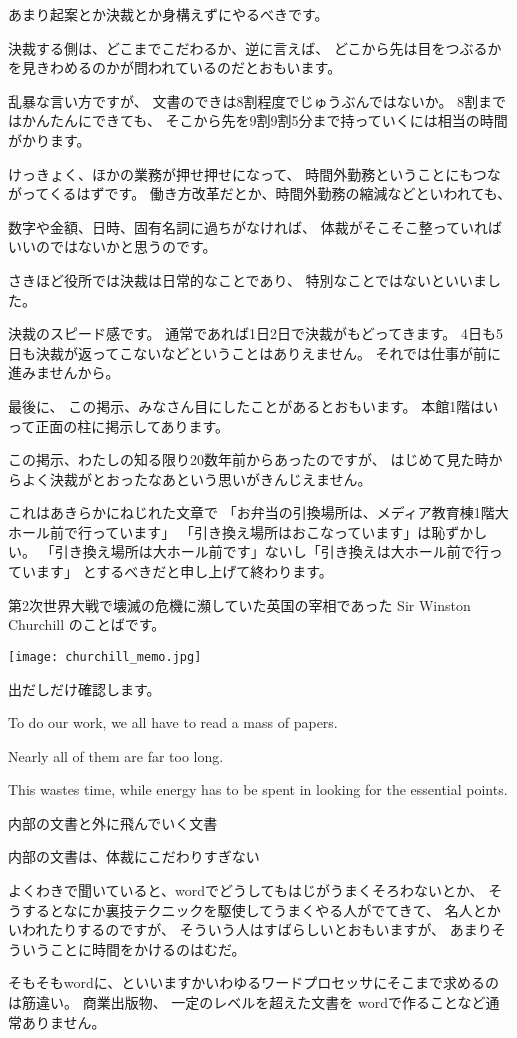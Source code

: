 \documentclass[uplatex,jis2004,dvipdfmx,12pt]{jsarticle}
\begin{document}
あまり起案とか決裁とか身構えずにやるべきです。

決裁する側は、どこまでこだわるか、逆に言えば、
どこから先は目をつぶるかを見きわめるのかが問われているのだとおもいます。


乱暴な言い方ですが、
文書のできは8割程度でじゅうぶんではないか。
8割まではかんたんにできても、
そこから先を9割9割5分まで持っていくには相当の時間がかります。

けっきょく、ほかの業務が押せ押せになって、
時間外勤務ということにもつながってくるはずです。
働き方改革だとか、時間外勤務の縮減などといわれても、


数字や金額、日時、固有名詞に過ちがなければ、
体裁がそこそこ整っていればいいのではないかと思うのです。






さきほど役所では決裁は日常的なことであり、
特別なことではないといいました。

決裁のスピード感です。
通常であれば1日2日で決裁がもどってきます。
4日も5日も決裁が返ってこないなどということはありえません。
それでは仕事が前に進みませんから。


最後に、
この掲示、みなさん目にしたことがあるとおもいます。
本館1階はいって正面の柱に掲示してあります。

この掲示、わたしの知る限り20数年前からあったのですが、
はじめて見た時からよく決裁がとおったなあという思いがきんじえません。

これはあきらかにねじれた文章で
「お弁当の引換場所は、メディア教育棟1階大ホール前で行っています」
「引き換え場所はおこなっています」は恥ずかしい。
「引き換え場所は大ホール前です」ないし「引き換えは大ホール前で行っています」
とするべきだと申し上げて終わります。



第2次世界大戦で壊滅の危機に瀕していた英国の宰相であった Sir Winston Churchill
のことばです。

\texttt{[image: churchill\_memo.jpg]}

出だしだけ確認します。

To do our work, we all have to read a mass of papers.

 Nearly all of them are far too long.

 This wastes time, while energy has to be spent in looking for the essential points.



内部の文書と外に飛んでいく文書

内部の文書は、体裁にこだわりすぎない

よくわきで聞いていると、wordでどうしてもはじがうまくそろわないとか、
そうするとなにか裏技テクニックを駆使してうまくやる人がでてきて、
名人とかいわれたりするのですが、
そういう人はすばらしいとおもいますが、
あまりそういうことに時間をかけるのはむだ。

そもそもwordに、といいますかいわゆるワードプロセッサにそこまで求めるのは筋違い。
商業出版物、
一定のレベルを超えた文書を
wordで作ることなど通常ありません。
\end{document}
